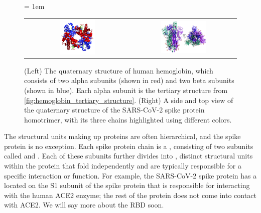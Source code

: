 \begin{figure}[h]
	\centering
	\mySfFamily
	\tabcolsep = 1em
	\begin{tabular}{c c}
	\includegraphics[width = 0.35\textwidth]{../images_CMYK/hemoglobin_quaternary_structure} & \includegraphics[width = 0.45\textwidth]{../images_CMYK/spike_protein_homotrimer}
	\end{tabular}
	\caption{(Left) The quaternary structure of human hemoglobin, which consists of two alpha subunits (shown in red) and two beta subunits (shown in blue). Each alpha subunit is the tertiary structure from \autoref{fig:hemoglobin_tertiary_structure}. (Right) A side and top view of the quaternary structure of the SARS-CoV-2 spike protein homotrimer, with its three chains highlighted using different colors.}
	\label{fig:quaternary_structure}
\end{figure}

The structural units making up proteins are often hierarchical, and the spike protein is no exception. Each spike protein chain is a , consisting of two subunits called  and . Each of these subunits further divides into , distinct structural units within the protein that fold independently and are typically responsible for a specific interaction or function. For example, the SARS-CoV-2 spike protein has a  located on the S1 subunit of the spike protein that is responsible for interacting with the human ACE2 enzyme; the rest of the protein does not come into contact with ACE2. We will say more about the RBD soon.

